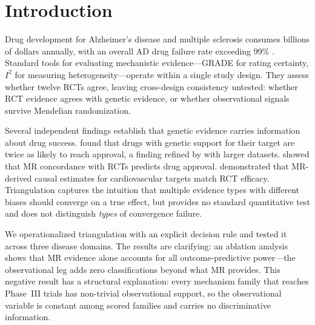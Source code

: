 \documentclass[11pt]{article}
\begin{document}
\begin{abstract}
The autoimmune domain reveals a mechanistically predictable boundary: three approved effector-neutralization drugs (anti-TNF, anti-IL-17, abatacept) show null MR because their targets are elevated as a \emph{consequence} of disease, not a cause. This defines where MR-based screening is expected to misclassify---soluble disease effectors vs.\ germline risk-encoding loci. Two cardiometabolic families with concordant etiologic evidence and pending Phase~III readouts (Lp(a)-lowering, IL-6 pathway inhibition) constitute pre-registered prospective predictions.
\end{abstract}

\section{Introduction}

Drug development for Alzheimer's disease and multiple sclerosis consumes billions of dollars annually, with an overall AD drug failure rate exceeding 99\% \citep{cummings2014}. Standard tools for evaluating mechanistic evidence---GRADE for rating certainty, $I^2$ for measuring heterogeneity---operate within a single study design. They assess whether twelve RCTs agree, leaving cross-design consistency untested: whether RCT evidence agrees with genetic evidence, or whether observational signals survive Mendelian randomization.

Several independent findings establish that genetic evidence carries information about drug success. \citet{nelson2015} found that drugs with genetic support for their target are twice as likely to reach approval, a finding refined by \citet{minikel2024} with larger datasets. \citet{gill2021} showed that MR concordance with RCTs predicts drug approval. \citet{ference2019} demonstrated that MR-derived causal estimates for cardiovascular targets match RCT efficacy. Triangulation \citep{lawlor2016} captures the intuition that multiple evidence types with different biases should converge on a true effect, but provides no standard quantitative test and does not distinguish \emph{types} of convergence failure.

We operationalized triangulation with an explicit decision rule and tested it across three disease domains. The results are clarifying: an ablation analysis shows that MR evidence alone accounts for all outcome-predictive power---the observational leg adds zero classifications beyond what MR provides. This negative result has a structural explanation: every mechanism family that reaches Phase~III trials has non-trivial observational support, so the observational variable is constant among scored families and carries no discriminative information.
\end{document}
